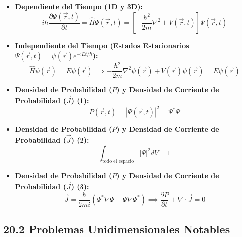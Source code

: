 \documentclass[11pt,a4paper]{article}
\begin{document}
\begin{itemize}
  \item \textbf{Dependiente del Tiempo (1D y 3D):}
  \[
    i\hbar \frac{\partial \Psi(\vec{r}, t)}{\partial t} = \hat{H}\Psi(\vec{r}, t) = \left[ -\frac{\hbar^2}{2m}\nabla^2 + V(\vec{r}, t) \right] \Psi(\vec{r}, t)
  \]
  \item \textbf{Independiente del Tiempo (Estados Estacionarios $\Psi(\vec{r}, t) = \psi(\vec{r})e^{-iEt/\hbar}$):}
  \[
    \hat{H}\psi(\vec{r}) = E\psi(\vec{r}) \implies -\frac{\hbar^2}{2m}\nabla^2\psi(\vec{r}) + V(\vec{r})\psi(\vec{r}) = E\psi(\vec{r})
  \]
  \item \textbf{Densidad de Probabilidad ($P$) y Densidad de Corriente de Probabilidad ($\vec{J}$) (1):}
  \[
    P(\vec{r}, t) = |\Psi(\vec{r}, t)|^2 = \Psi^* \Psi
  \]
  \item \textbf{Densidad de Probabilidad ($P$) y Densidad de Corriente de Probabilidad ($\vec{J}$) (2):}
  \[
    \int_{\text{todo el espacio}} |\Psi|^2 dV = 1
  \]
  \item \textbf{Densidad de Probabilidad ($P$) y Densidad de Corriente de Probabilidad ($\vec{J}$) (3):}
  \[
    \vec{J} = \frac{\hbar}{2mi}(\Psi^* \nabla\Psi - \Psi \nabla\Psi^*) \implies \frac{\partial P}{\partial t} + \nabla \cdot \vec{J} = 0
  \]
\end{itemize}

\subsection*{20.2 Problemas Unidimensionales Notables}
\end{document}
